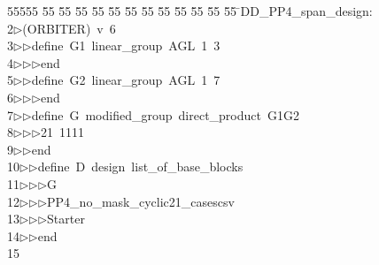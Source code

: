 %
%
\begin{tabbing}
55555 \= 55 \= 55 \= 55 \= 55 \= 55 \= 55 \= 55 \= 55 \= 55 \= 55 \= 55 \= 55 \= \>DD\_PP4\_span\_design:\\[0pt]
2\>$\triangleright$\>(ORBITER)\ v\ 6\ \\[0pt]
3\>$\triangleright$\>$\triangleright$\>define\ G1\ linear\_group\ AGL\ 1\ 3\ \\[0pt]
4\>$\triangleright$\>$\triangleright$\>$\triangleright$\>end\ \\[0pt]
5\>$\triangleright$\>$\triangleright$\>define\ G2\ linear\_group\ AGL\ 1\ 7\ \\[0pt]
6\>$\triangleright$\>$\triangleright$\>$\triangleright$\>end\ \\[0pt]
7\>$\triangleright$\>$\triangleright$\>define\ G\ modified\_group\ direct\_product\ G1G2\ \\[0pt]
8\>$\triangleright$\>$\triangleright$\>$\triangleright$\>21\ 1111\ \\[0pt]
9\>$\triangleright$\>$\triangleright$\>end\ \\[0pt]
10\>$\triangleright$\>$\triangleright$\>define\ D\ design\ list\_of\_base\_blocks\ \\[0pt]
11\>$\triangleright$\>$\triangleright$\>$\triangleright$\>G\ \\[0pt]
12\>$\triangleright$\>$\triangleright$\>$\triangleright$\>PP4\_no\_mask\_cyclic21\_casescsv\\[0pt]
13\>$\triangleright$\>$\triangleright$\>$\triangleright$\>Starter\ \\[0pt]
14\>$\triangleright$\>$\triangleright$\>end\\[0pt]
15\>\end{tabbing}

